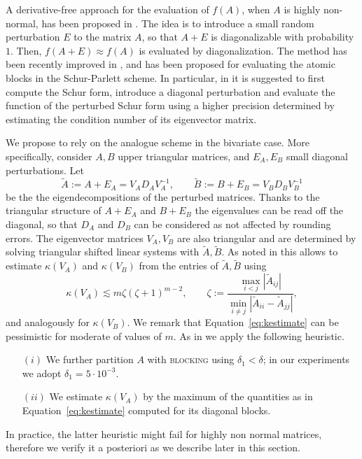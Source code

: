 \documentclass{siamart1116}
\renewcommand{\tilde}{\widetilde}
\begin{document}
A derivative-free approach for the evaluation of
$f(A)$, when $A$ is highly non-normal, has been proposed
in \cite{davies2008approximate}. The idea is to introduce a small random 
perturbation $E$ to the matrix $A$, so that
$A+E$ is diagonalizable with probability $1$. Then,
$f(A + E) \approx f(A)$ is evaluated by diagonalization. 
The method has been
recently improved in \cite{higham2020multiprecision},
and has been proposed for evaluating the atomic blocks
in the Schur-Parlett scheme. In particular, in \cite{higham2020multiprecision}
it is suggested to first compute the Schur form, introduce a diagonal perturbation and evaluate the function of the perturbed Schur form using a higher precision determined by estimating the 
condition number of its eigenvector matrix.

We propose to rely on the analogue scheme 
in the bivariate case.
More specifically, consider $A, B$ upper triangular
matrices, and $E_A, E_B$ small diagonal
perturbations. Let
\[
  \tilde A := A + E_A = V_A D_A V_A^{-1}, \qquad 
  \tilde B := B + E_B = V_B D_B V_B^{-1}
\]
be the the eigendecompositions of the perturbed
matrices. Thanks to the triangular
structure of $A + E_A$ and $B + E_B$ the eigenvalues 
can be read off the diagonal, so that
$D_A$ and $D_B$ can be considered as not
affected by rounding errors. 
The eigenvector matrices $V_A, V_B$ are also triangular and are determined by solving
triangular shifted linear systems with $\tilde A, \tilde B$. As 
noted in \cite{higham2020multiprecision} this allows to estimate
$\kappa(V_A)$ and $\kappa(V_B)$ from the entries of $\tilde A, \tilde B$
using 
\begin{equation} \label{eq:kestimate}
    \kappa(V_A) \lesssim
      m\zeta(\zeta +1)^{m-2}, \qquad \zeta:= \frac{\max_{i<j} |\tilde A_{ij}|}{\min_{i \neq j} |\tilde A_{ii} - \tilde A_{jj}|}, 
\end{equation}
and analogously for $\kappa(V_B)$. We remark that Equation~\ref{eq:kestimate} can be pessimistic for moderate of values of $m$. As in \cite{higham2020multiprecision} we apply the following heuristic.
\begin{itemize}
\item[$(i)$] We further partition $A$ with \textsc{blocking} using $\delta_1<\delta$; in our experiments we adopt $\delta_1=5\cdot 10^{-3}$.
\item[$(ii)$] We estimate $\kappa(V_A)$ by the maximum of the quantities as in Equation~\ref{eq:kestimate} computed for its diagonal blocks.
\end{itemize}
In practice, the latter heuristic might fail for highly non normal matrices, therefore we verify it a posteriori as we describe later in this section.   
\end{document}
